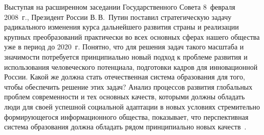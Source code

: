 \begin{multicols}{2}
     Выступая на расширенном заседании Государственного Совета 8~февраля 2008~г.,
Президент России В.\,В.~Путин поставил стратегическую задачу радикального изменения
курса дальнейшего развития страны и реализации крупных преобразований практически
во всех основных сферах нашего общества уже в период до 2020~г. Понятно, что для
решения задач такого масштаба и зна\-чи\-мости %
потре\-бу\-ет\-ся принципиально новый подход
к проблеме развития и использования человеческого потенциала, подготовки кадров для
инновационной России. Какой же должна стать отечественная %
сис\-те\-ма образования для
того, чтобы обеспечить решение этих задач? Анализ процессов развития глобальных
проблем современности и тех основных качеств, которыми должны обладать люди для
своей успешной социальной адаптации в новых условиях стремительно формирующегося
информационного общества, показывает, что перспективная система образования должна
обладать рядом принципиально новых качеств~\cite{4ss, 5ss}.


\end{multicols}
